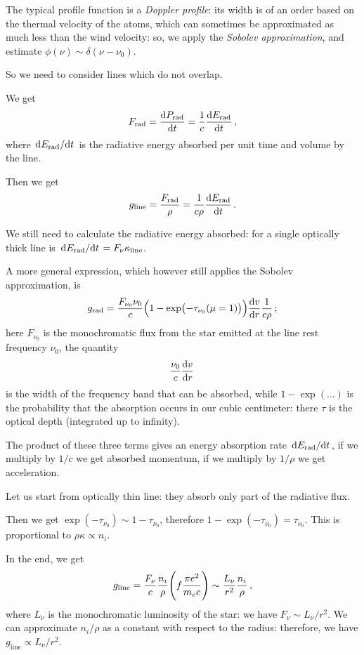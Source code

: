 \documentclass[main.tex]{subfiles}
\begin{document}
The typical profile function is a \emph{Doppler profile}: its width is of an order based on the thermal velocity of the atoms, which can sometimes be approximated as much less than the wind velocity: so, we apply the \emph{Sobolev approximation}, and estimate \(\phi (\nu ) \sim \delta (\nu - \nu_0 )\). 

So we need to consider lines which do not overlap. 

We get 
%
\begin{align}
  F _{\text{rad}} = \dv{P _{\text{rad}}}{t} 
  = \frac{1}{c} \dv{E _{\text{rad}}}{t}
\,,
\end{align}
%
where \(\dv*{E _{\text{rad}}}{t}\) is the radiative energy absorbed per unit time and volume by the line.

Then we get 
%
\begin{align}
  g _{\text{line}} = \frac{F _{\text{rad}}}{\rho }
  = \frac{1}{c \rho } \dv{E _{\text{rad}}}{t}
\,.
\end{align}
 
We still need to calculate the radiative energy absorbed: for a single optically thick line is \(\dv*{E _{\text{rad}}}{t} = F_{\nu } \kappa _{\text{line}}\).

A more general expression, which however still applies the Sobolev approximation, is 
%
\begin{align}
  g _{\text{rad}} = \frac{F_{\nu_0} \nu_0 }{c} \qty(1 - \exp(- \tau_{\nu_0 } (\mu=1)) ) \dv{v}{r} \frac{1}{c \rho }
\,;
\end{align}
%
here \(F_{\nu_0}\) is the monochromatic flux from the star emitted at the line rest frequency \(\nu_0 \), the quantity 
%
\begin{align}
  \frac{\nu_0}{c} \dv{v}{r} 
\,
\end{align}
%
is the width of the frequency band that can be absorbed, while \(1 - \exp(\dots) \) is the probability that the absorption occurs in our cubic centimeter: there \(\tau \) is the optical depth (integrated up to infinity).

The product of these three terms gives an energy absorption rate \(\dv*{E _{\text{rad}}}{t}\), if we multiply by \(1/c\) we get absorbed momentum, if we multiply by \(1/ \rho \) we get acceleration.

Let us start from optically thin line: they absorb only part of the radiative flux.

Then we get \(\exp(-\tau_{\nu_0 }) \sim 1- \tau_{\nu_0 } \), therefore \(1- \exp(-\tau_{\nu_0 }) = \tau_{\nu_0 } \).
This is proportional to \(\rho \kappa \propto n_i\).

In the end, we get 
%
\begin{align}
  g_{\text{line}} = \frac{F_{\nu }}{c} \frac{n_i}{\rho } \qty(f \frac{\pi e^2}{m_e c}) \sim \frac{L_{\nu }}{r^2} \frac{n_i}{\rho }
\,,
\end{align}
%
where \(L_{\nu }\) is the monochromatic luminosity of the star: we have \(F_{\nu } \sim L_{\nu }/ r^2\).
We can approximate \(n_i / \rho \) as a constant with respect to the radius: therefore, we have \(g _{\text{line}} \propto L_{\nu } / r^2\).
\end{document}
